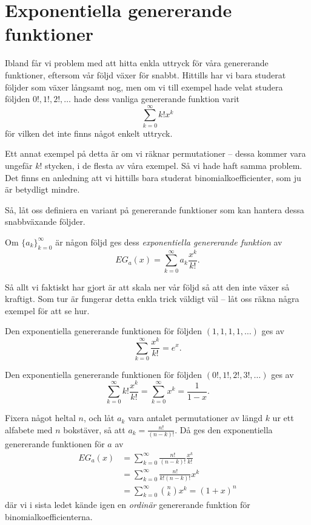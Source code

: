\documentclass[nobib]{tufte-handout}
\begin{document}
\section{Exponentiella genererande funktioner}

Ibland får vi problem med att hitta enkla uttryck för våra genererande funktioner, eftersom vår följd växer för snabbt. Hittills har vi bara studerat följder som växer långsamt nog, men om vi till exempel hade velat studera följden $0!, 1!, 2!,\ldots$ hade dess vanliga genererande funktion varit 
$$\sum_{k=0}^{\infty} k!x^k$$
för vilken det inte finns något enkelt uttryck.

Ett annat exempel på detta är om vi räknar permutationer -- dessa kommer vara ungefär $k!$ stycken, i de flesta av våra exempel. Så vi hade haft samma problem. Det finns en anledning att vi hittills bara studerat binomialkoefficienter, som ju är betydligt mindre.

Så, låt oss definiera en variant på genererande funktioner som kan hantera dessa snabbväxande följder.

\begin{definition}
  Om $\{a_k\}_{k=0}^\infty$ är någon följd ges dess \emph{exponentiella genererande funktion} av
  $$EG_a(x) = \sum_{k=0}^{\infty} a_k \frac{x^k}{k!}.$$
\end{definition}

Så allt vi faktiskt har gjort är att skala ner vår följd så att den inte växer så kraftigt. Som tur är fungerar detta enkla trick väldigt väl -- låt oss räkna några exempel för att se hur.

\begin{example}
  Den exponentiella genererande funktionen för följden $(1,1,1,1,\ldots)$ ges av
  $$\sum_{k=0}^{\infty} \frac{x^k}{k!} = e^x.$$
\end{example}

\begin{example}
  Den exponentiella genererande funktionen för följden $(0!, 1!, 2!, 3!, \ldots)$ ges av
  $$\sum_{k=0}^{\infty} k!\frac{x^k}{k!} = \sum_{k=0}^{\infty} x^k = \frac{1}{1-x}.$$
\end{example}

\begin{example}
  Fixera något heltal $n$, och låt $a_k$ vara antalet permutationer av längd $k$ ur ett alfabete med $n$ bokstäver, så att $a_k = \frac{n!}{(n-k)!}$. Då ges den exponentiella genererande funktionen för $a$ av
  \begin{align*}
    EG_a(x) &= \sum_{k=0}^{\infty} \frac{n!}{(n-k)!}\frac{x^k}{k!}\\
    &= \sum_{k=0}^{\infty} \frac{n!}{k!(n-k)!}x^k\\
    &= \sum_{k=0}^{\infty} \binom{n}{k} x^k = (1 + x)^n
  \end{align*}
  där vi i sista ledet kände igen en \emph{ordinär} genererande funktion för binomialkoefficienterna.
\end{example}
\end{document}

